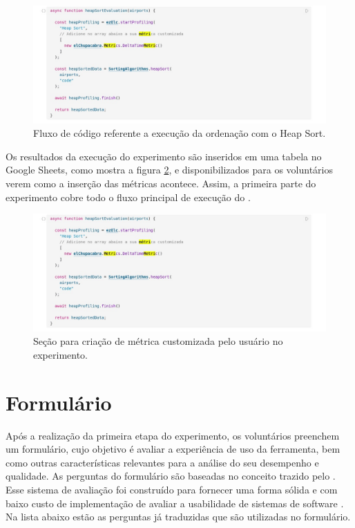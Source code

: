 \documentclass[12pt]{tcc}
\begin{document}
	\begin{figure}[!ht]
		\centering
		\includegraphics[width=1\textwidth]{figures/experimento-heap.jpeg}
		\caption{Fluxo de código referente a execução da ordenação com o Heap Sort.}
		\label{fig:experimento-heap}
	\end{figure}


	Os resultados da execução do experimento são inseridos em uma tabela no Google Sheets, como mostra a figura \ref{fig:experimento-tabela-resultado}, e disponibilizados para os voluntários verem como a inserção das métricas acontece. Assim, a primeira parte do experimento cobre todo o fluxo principal de execução do .

	\begin{figure}[!ht]
		\centering
		\includegraphics[width=1\textwidth]{figures/experimento-heap.jpeg}
		\caption{Seção para criação de métrica customizada pelo usuário no experimento.}
		\label{fig:experimento-tabela-resultado}
	\end{figure}


	\section{Formulário}
	\label{section:parte-2-formulario}

	Após a realização da primeira etapa do experimento, os voluntários preenchem um formulário, cujo objetivo é avaliar a experiência de uso da ferramenta, bem como outras características relevantes para a análise do seu desempenho e qualidade. As perguntas do formulário são baseadas no conceito trazido pelo . Esse sistema de avaliação foi construído para fornecer uma forma sólida e com baixo custo de implementação de avaliar a usabilidade de sistemas de software \citep{brooke1995sus}. Na lista abaixo estão as perguntas já traduzidas que são utilizadas no formulário.
\end{document}
